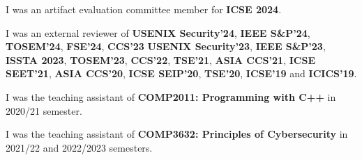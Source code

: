  






I was an artifact evaluation committee member for \textbf{ICSE 2024}.

I was an external reviewer of \textbf{USENIX Security'24}, \textbf{IEEE S\&P'24}, \textbf{TOSEM'24}, \textbf{FSE'24}, \textbf{CCS'23} \textbf{USENIX Security'23}, \textbf{IEEE S\&P'23}, \textbf{ISSTA 2023}, \textbf{TOSEM'23}, \textbf{CCS'22}, \textbf{TSE'21}, \textbf{ASIA CCS'21}, \textbf{ICSE SEET'21}, \textbf{ASIA CCS'20}, \textbf{ICSE SEIP'20}, \textbf{TSE'20}, \textbf{ICSE'19} and \textbf{ICICS'19}.

I was the teaching assistant of \textbf{COMP2011: Programming with C++} in 2020/21 semester.

I was the teaching assistant of \textbf{COMP3632: Principles of Cybersecurity} in 2021/22 and 2022/2023 semesters.

